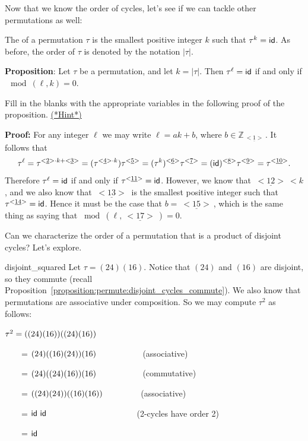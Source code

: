 Now that we know the order of cycles, let's see if we can tackle other permutations as well:

\begin{defn}
The  of a permutation $\tau$ is the smallest positive integer $k$ such that $\tau^k = {\sf{i}d}$.   As before, the order of $\tau$ is denoted by the notation $|\tau|$. 
\end{defn}



\noindent
{\bf Proposition}: Let $\tau$ be a permutation, and let $k = |\tau|$. Then $\tau^{\ell} = {\sf{i}d}$ if and only if $\mod(\ell,k)=0$.
\medskip

\begin{exercise}{64}
Fill in the blanks with the appropriate variables in the following proof of the proposition.
\hyperref[sec:permute:hints]{(*Hint*)}
\medskip

\noindent
{\bf Proof:} For any integer $\ell$ we may write $\ell = ak + b$, where $b \in \mathbb{Z}_{\underline{~<1>~}} $. It follows that
\[ \tau^{\ell} = \tau^{<\underline{2}> \cdot k + <\underline{3}>} = (\tau^{<\underline{4}> \cdot k})\tau^{<\underline{5}>} =   (\tau^k)^{<\underline{6}>}\tau^{<\underline{7}>} = ({\sf{i}d})^{<\underline{8}>}\tau^{<\underline{9}>} = \tau^{<\underline{10}>} . \]
Therefore $\tau^{\ell} = {\sf{i}d}$ if and only if $\tau^{<\underline{11}>} = {\sf{i}d}$. However, we know that $\underline{~<12>~} < k$, and we also know that $\underline{~<13>~}$ is the smallest positive integer such that  $\tau^{<\underline{14}>} = {\sf{i}d}$. Hence it must be the case that $b= \underline{~<15>~}$, which is the same thing as saying that  $\bmod(\ell,\underline{~<17>~})=0$.
\end{exercise}


Can we characterize the order of a permutation that is a product of disjoint cycles?  Let's explore.

\begin{example}{disjoint_squared}
Let $\tau = (2 4)(1 6).$ Notice that $(2 4)$ and $(1 6)$ are disjoint, so they commute (recall Proposition~\ref{proposition:permute:disjoint_cycles_commute}). We also know that permutations are associative under composition. So we may compute $\tau^2$ as follows:

\noindent
$\tau^2 = {\large(} (2 4 )(1 6 ) {\large )} {\large(} (2 4 )(1 6 ) {\large )}$
 
~~~~=  $(2 4) {\large(} (1 6) (2 4 ) {\large )} (1 6 )$~~~~~~~~~~~(associative) 

~~~~=  $(2 4 ) {\large(} (2 4 ) (1 6)  {\large )} (1 6 )$~~~~~~~~~~~(commutative) 

~~~~=  ${\large(}  (2 4 ) (2 4 ) {\large )} {\large(}  (1 6) (1 6 ) {\large )}$~~~~~~~~~(associative) 

~~~~=  ${\sf{i}d}~{\sf{i}d}$ ~~~~~~~~~~~~~~~~~~~~~(2-cycles have order 2) 

~~~~=  ${\sf{i}d}$   

\end{example}



